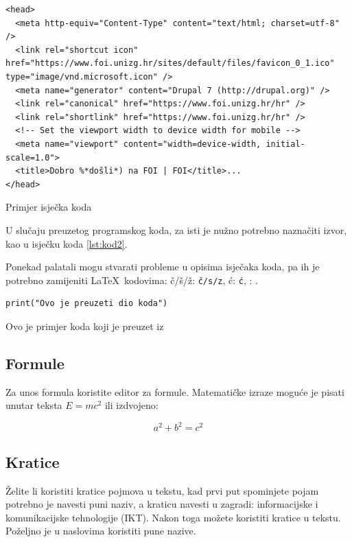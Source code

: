 \documentclass[]{foi}
\begin{document}
\begin{listing}
	\begin{verbatim}
<head>
  <meta http-equiv="Content-Type" content="text/html; charset=utf-8" />
  <link rel="shortcut icon" href="https://www.foi.unizg.hr/sites/default/files/favicon_0_1.ico" type="image/vnd.microsoft.icon" />
  <meta name="generator" content="Drupal 7 (http://drupal.org)" />
  <link rel="canonical" href="https://www.foi.unizg.hr/hr" />
  <link rel="shortlink" href="https://www.foi.unizg.hr/hr" />
  <!-- Set the viewport width to device width for mobile -->
  <meta name="viewport" content="width=device-width, initial-scale=1.0">
  <title>Dobro %*došli*) na FOI | FOI</title>...
</head>
    \end{verbatim}
	\caption{Primjer isječka koda}
	\label{lst:dva}
\end{listing}

U slučaju preuzetog programskog koda, za isti je nužno potrebno naznačiti izvor, kao u isječku koda \ref{lst:kod2}.

Ponekad palatali mogu stvarati probleme u opisima isječaka koda, pa ih je potrebno zamijeniti \LaTeX\ kodovima: \v{c}/\v{s}/\v{z}: \texttt{\v{c/s/z}}, \'{c}: \texttt{\'{c}}, \dj: \texttt{\dj}.


\begin{listing}
	\begin{verbatim}
print("Ovo je preuzeti dio koda")
    \end{verbatim}
	\caption[Ovo je primjer koda koji je preuzet]{Ovo je primjer koda koji je preuzet iz \cite[str. 23]{russell2022ArtificialIntelligenceModern}}
	\label{lst:kod2}
\end{listing}



\subsection{Formule}

Za unos formula koristite editor za formule. Matematičke izraze moguće je pisati unutar teksta $E = mc^2$ ili izdvojeno:

$$
	a^2 + b^2 = c^2
$$

\subsection{Kratice}

Želite li koristiti kratice pojmova u tekstu, kad prvi put spominjete pojam potrebno je navesti puni naziv, a kraticu navesti u zagradi: informacijske i komunikacijske tehnologije (IKT). Nakon toga možete koristiti kratice u tekstu. Poželjno je u naslovima koristiti pune nazive.
\end{document}
